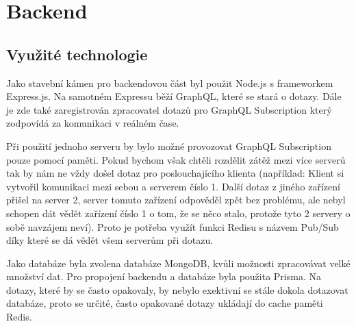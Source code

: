 \section{Backend}

\subsection{Využité technologie}
Jako stavební kámen pro backendovou část byl použit Node.js s frameworkem Express.js. Na samotném Expressu běží GraphQL, které se stará o dotazy. Dále je zde také zaregistrován zpracovatel dotazů pro GraphQL Subscription který zodpovídá za komunikaci v reálném čase.\par
Při použití jednoho serveru by bylo možné provozovat GraphQL Subscription pouze pomocí paměti. Pokud bychom však chtěli rozdělit zátěž mezi více serverů tak by nám ne vždy došel dotaz pro poslouchajícího klienta (například: Klient si vytvořil komunikaci mezi sebou a serverem číslo 1. Další dotaz z jiného zařízení přišel na server 2, server tomuto zařízení odpověděl zpět bez problému, ale nebyl schopen dát vědět zařízení číslo 1 o tom, že se něco stalo, protože tyto 2 servery o sobě navzájem neví). Proto je potřeba využít funkci Redisu s názvem Pub/Sub\cite{PubSub} díky které se dá vědět všem serverům při dotazu.\par
Jako databáze byla zvolena databáze MongoDB, kvůli možnosti zpracovávat velké množství dat. Pro propojení backendu a databáze byla použita Prisma. Na dotazy, které by se často opakovaly, by nebylo exektivní se stále dokola dotazovat databáze, proto se určité, často opakované dotazy ukládají do cache paměti Redis.\par

